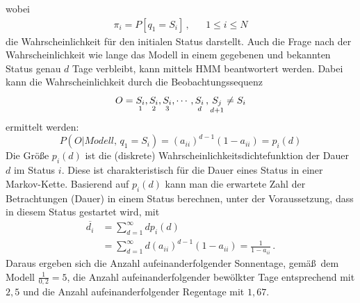 wobei
\begin{align} \label{E:PropMarkovWetterPi}
\pi _i = P[q_1 = S_i]\, , & & 1 \leq i \leq N
\end{align}
die Wahrscheinlichkeit f\"ur den initialen Status darstellt.
\newline
Auch die Frage nach der Wahrscheinlichkeit wie lange das Modell in einem gegebenen und bekannten Status genau $d$ Tage verbleibt, kann mittels \gls{HMM} beantwortert werden. Dabei kann die Wahrscheinlichkeit durch die Beobachtungssequenz
\begin{equation}
O = {\underset{1}{S_i}, \underset{2}{S_i}, \underset{3}{S_i}, \cdots, \underset{d}{S_i}\, , \underset{d+1}{S_j} \ne S_i} \notag
\end{equation}
ermittelt werden:
\begin{equation}
\label{E:PropMarkovD}
P(O | Modell,\, q_1 = S_i) = (a_{ii})^{d-1}(1 - a_{ii}) = p_i(d)
\end{equation}
Die Gr\"o\ss e $p_i(d)$ ist die (diskrete) Wahrscheinlichkeitsdichtefunktion der Dauer $d$ im Status $i$. Diese ist charakteristisch f\"ur die Dauer eines Status in einer Markov-Kette. Basierend auf $p_i(d)$ kann man die erwartete Zahl der Betrachtungen (Dauer) in einem Status berechnen, unter der Voraussetzung, dass in diesem Status gestartet wird, mit
\begin{subequations}\label{E:MarkovDuration}
    \begin{alignat}{2}
      \overline{d_i} &= \sum_{d= 1}^{\infty} dp_i(d)\label{E:MarkovDuration1}\\
      &= \sum_{d = 1}^{\infty} d(a_{ii})^{d - 1} (1 - a_{ii}) = \frac{1}{1 - a_{ii}} \, . \label{E:MarkovDuration2}
    \end{alignat}
  \end{subequations}
Daraus ergeben sich die Anzahl aufeinanderfolgender Sonnentage, gem\"a\ss \, dem Modell $\frac{1}{0,2} = 5$,  die Anzahl aufeinanderfolgender bew\"olkter Tage entsprechend mit $2,5$ und die Anzahl aufeinanderfolgender Regentage mit $1,67$.

